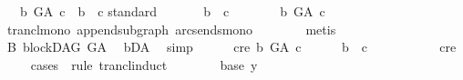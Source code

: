 \begin{isabellebody}
\ \ \ {\isachardoublequoteopen}{\isacharparenleft}{\kern0pt}b\ {\isasymrightarrow}\isactrlsup {\isacharplus}{\kern0pt}\isactrlbsub G{\isacharunderscore}{\kern0pt}A\isactrlesub \ c{\isacharparenright}{\kern0pt}\ {\isasymlongleftrightarrow}\ b\ {\isasymrightarrow}\isactrlsup {\isacharplus}{\kern0pt}\ c{\isachardoublequoteclose}\isanewline
%
\isadelimproof
%
\endisadelimproof
%
\isatagproof
{}\isamarkupfalse%
{\isacharparenleft}{\kern0pt}standard{\isacharparenright}{\kern0pt}\isanewline
\ \ \ \ \isamarkupfalse%
\ \ {\isachardoublequoteopen}b\ {\isasymrightarrow}\isactrlsup {\isacharplus}{\kern0pt}\ c{\isachardoublequoteclose}\isanewline
\ \ \ \ \isamarkupfalse%
\ \isamarkupfalse%
\ {\isachardoublequoteopen}b\ {\isasymrightarrow}\isactrlsup {\isacharplus}{\kern0pt}\isactrlbsub G{\isacharunderscore}{\kern0pt}A\isactrlesub \ c{\isachardoublequoteclose}\isanewline
\ \ \ \ \ \ \isamarkupfalse%
\ trancl{\isacharunderscore}{\kern0pt}mono\ append{\isacharunderscore}{\kern0pt}subgraph\ arcs{\isacharunderscore}{\kern0pt}ends{\isacharunderscore}{\kern0pt}mono\isanewline
\ \ \ \ \ \ \isamarkupfalse%
\ {\isacharparenleft}{\kern0pt}metis{\isacharparenright}{\kern0pt}\ \ \isanewline
\ \ \isamarkupfalse%
\ \isanewline
\ \ \ \ \isamarkupfalse%
\ B{}{\isacharcolon}{\kern0pt}\ blockDAG\ {\isachardoublequoteopen}G{\isacharunderscore}{\kern0pt}A{\isachardoublequoteclose}\ \isamarkupfalse%
\ bD{\isacharunderscore}{\kern0pt}A\ \isamarkupfalse%
\ simp\isanewline
\ \ \ \ \isamarkupfalse%
\ c{\isacharunderscore}{\kern0pt}re{\isacharcolon}{\kern0pt}\ {\isachardoublequoteopen}b\ {\isasymrightarrow}\isactrlsup {\isacharplus}{\kern0pt}\isactrlbsub G{\isacharunderscore}{\kern0pt}A\isactrlesub \ c{\isachardoublequoteclose}\isanewline
\ \ \ \ \isamarkupfalse%
\ {\isachardoublequoteopen}b\ {\isasymrightarrow}\isactrlsup {\isacharplus}{\kern0pt}\ c{\isachardoublequoteclose}\ \ \ \isanewline
\ \ \ \ \ \ \isamarkupfalse%
\ c{\isacharunderscore}{\kern0pt}re\isanewline
\ \ \ \ \isamarkupfalse%
{\isacharparenleft}{\kern0pt}cases\ \ rule{\isacharcolon}{\kern0pt}\ trancl{\isacharunderscore}{\kern0pt}induct{\isacharparenright}{\kern0pt}\isanewline
\ \ \ \ \ \ \isamarkupfalse%
\ {\isacharparenleft}{\kern0pt}base\ y{\isacharparenright}{\kern0pt}\isanewline
\ \ \ \ \ \ \isamarkupfalse%
\ \isamarkupfalse%

\end{isabellebody}

